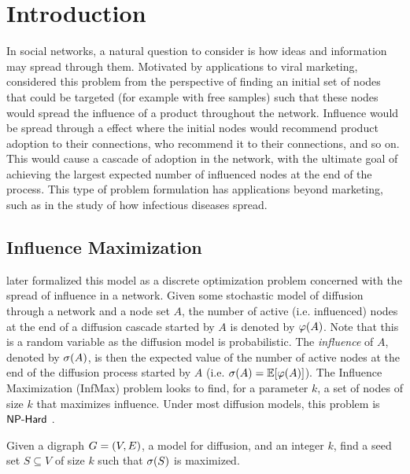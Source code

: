 \section{Introduction}
In social networks, a natural question to consider is how ideas and information may spread through them. Motivated by applications to viral marketing, \citet{domingos2001mining} considered this problem 
from the perspective of finding an initial set of nodes that could be targeted (for example with free samples) such that these nodes would spread the influence of a product throughout the network. Influence would be spread through a  effect where the initial nodes would recommend product adoption to their connections, who recommend it to their connections, and so on. 
This would cause a cascade of adoption in the network, with the ultimate goal of achieving the largest expected number of influenced nodes at the end of the process. 
This type of problem formulation has applications beyond marketing, such as in the study of how infectious diseases spread.  

\subsection{Influence Maximization}
\citet{kempe2003maximizing, kempe2005influential} later formalized this model as a discrete optimization problem concerned with the spread of influence in a network.
Given some stochastic model of diffusion through a network and a node set $A$, the number of active (i.e.\! influenced) nodes at the end of a diffusion cascade started by $A$ is denoted by $\varphi \! \left( A \right)$. 
Note that this is a random variable as the diffusion model is probabilistic. The \emph{influence} of $A$, denoted by $\sigma \! \left( A \right)$, is then the expected value of the number of active nodes at the end of the diffusion process started by $A$ (i.e.\! $\sigma \! \left( A \right) = \mathbb{E}\! \left[ \varphi \! \left( A \right) \right]$).
The \textsf{Influence Maximization (InfMax)} problem looks to find, for a parameter $k$, a  set of nodes of size $k$ that maximizes influence. 
Under most diffusion models, this problem is $\textsf{NP-Hard}$ \cite{kempe2003maximizing, kempe2005influential}. 

\begin{problem}
    Given a digraph $G = \left( V, E \right)$, a model for diffusion, and an integer $k$, find a seed set $S \subseteq V$ of size $k$
    such that $\sigma \! \left( S \right)$ is maximized. 
    \label{prob:infmax}
\end{problem}

